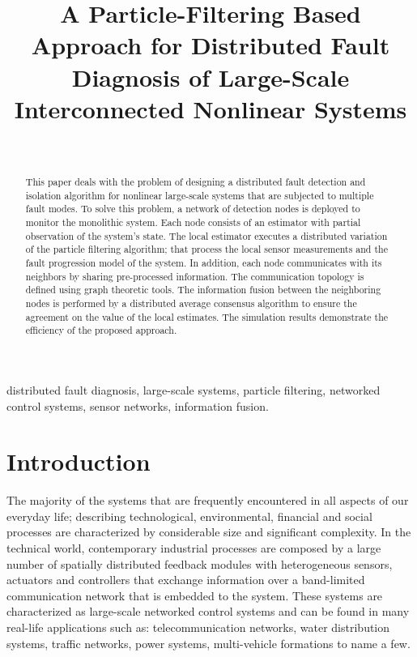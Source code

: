 \documentclass[10pt,twocolumn,twoside]{IEEEtran}
\title{A Particle-Filtering Based Approach for Distributed Fault Diagnosis of Large-Scale Interconnected Nonlinear Systems}
\author{
\authorblockN{Elaheh Noursadeghi, Ioannis Raptis}\\
\authorblockA{Mechanical Engineering Department, University of Massachusetts Lowell\\
  Email: $\{$Elaheh\_Noursadeghi, Ioannis\_Raptis$\}$@uml.edu}
}
\begin{document}
\maketitle

\begin{abstract}
This paper deals with the problem of designing a distributed fault detection and isolation algorithm for nonlinear large-scale systems that are subjected to multiple fault modes. To solve this problem, a network of detection nodes is deployed to monitor the monolithic system. Each node consists of an estimator with partial observation of the system's state. The local estimator executes a distributed variation of the particle filtering algorithm; that process the local sensor measurements and the fault progression model of the system. In addition, each node communicates with its neighbors by sharing pre-processed information. The communication topology is defined using graph theoretic tools. The information fusion between the neighboring nodes is performed by a distributed average consensus algorithm to ensure the agreement on the value of the local estimates. The simulation results demonstrate the efficiency of the proposed approach. 
\end{abstract}

\begin{keywords}
distributed fault diagnosis, large-scale systems, particle filtering, networked control systems, sensor networks, information fusion.
\end{keywords}



\section{Introduction}

The majority of the systems that are frequently encountered in all aspects of our everyday life; describing technological, environmental, financial and social processes are characterized by considerable size and significant complexity. In the technical world, contemporary industrial processes are composed by a large number of spatially distributed feedback modules with heterogeneous sensors, actuators and controllers that exchange information over a band-limited communication network that is embedded to the system. These systems are characterized as large-scale networked control systems and can be found in many real-life applications such as: telecommunication networks, water distribution systems, traffic networks, power systems, multi-vehicle formations to name a few. 
\end{document}
